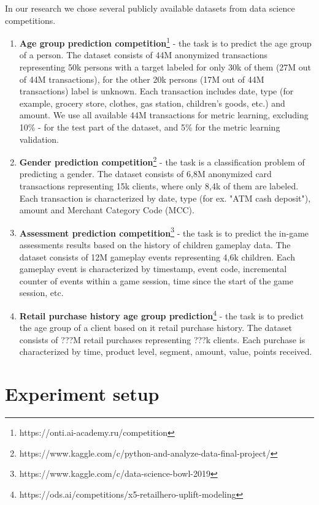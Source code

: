 \documentclass{article}
\begin{document}
In our research we chose several publicly available datasets from data science competitions.
\begin{enumerate}
    \item \textbf{Age group prediction competition}\footnote{https://onti.ai-academy.ru/competition} - the task is to predict the age group of a person. The dataset consists of 44M anonymized transactions representing 50k persons with a target labeled for only 30k of them (27M out of 44M transactions), for the other 20k persons (17M out of 44M transactions) label is unknown. Each transaction includes date, type (for example, grocery store, clothes, gas station, children's goods, etc.) and amount. We use all available 44M transactions for metric learning, excluding 10\% - for the test part of the dataset, and  5\% for the metric learning validation.
        
    \item \textbf{Gender prediction competition}\footnote{https://www.kaggle.com/c/python-and-analyze-data-final-project/} - the task is a classification problem of predicting a gender. The dataset consists of 6,8M anonymized card transactions representing 15k clients, where only 8,4k of them are labeled. Each transaction is characterized by date, type (for ex. "ATM cash deposit"), amount and Merchant Category Code (MCC).
    
    \item \textbf{Assessment prediction competition}\footnote{https://www.kaggle.com/c/data-science-bowl-2019} - the task is to predict the in-game assessments results based on the history of children gameplay data. The dataset consists of 12M gameplay events representing 4,6k children. Each gameplay event is characterized by timestamp, event code, incremental counter of events within a game session, time since the start of the game session, etc.
    
    \item \textbf{Retail purchase history age group prediction}\footnote{https://ods.ai/competitions/x5-retailhero-uplift-modeling} - the task is to predict the age group of a client based on it retail purchase history. The dataset consists of ???M retail purchases representing ???k clients. Each purchase is characterized by time, product level, segment, amount, value, points received.

\end{enumerate}

\section{Experiment setup} \label{sec-exp-setup}
\end{document}

